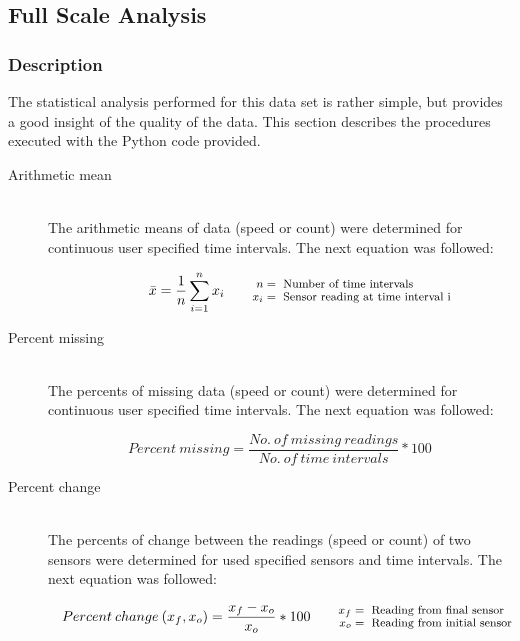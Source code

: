 \documentclass[11pt]{article}
\begin{document}
\subsection{Full Scale Analysis}

\subsubsection{Description}
The statistical analysis performed for this data set is rather simple, but provides a good insight of the quality of the data. This section describes the procedures executed with the Python code provided.

\begin{description}
	\item[Arithmetic mean] \hfill \\
	The arithmetic means of data (speed or count) were determined for continuous user specified time intervals. The next equation was followed:	
	

	\begin{equation}
		\bar{x} = \frac{1}{n}\sum\limits_{i=1}^{n}x_i
		\qquad\parbox{4.0cm}{\footnotesize$
		\begin{aligned}
			 n &= \text{ Number of time intervals}\\[-1.0ex]
			 x_{i} &= \text{ Sensor reading at time interval i}
		\end{aligned}$}
	\end{equation}	
	
	
	\item[Percent missing] \hfill \\
	The percents of missing data (speed or count) were determined for continuous user specified time intervals. The next equation was followed:

	\begin{equation}
		{Percent\:missing} = \frac{No.\:of\:missing\:readings}{No.\:of\:time\:intervals}*100	
	\end{equation}		
	
	\item[Percent change] \hfill \\
	The percents of change between the readings (speed or count) of two sensors were determined for used specified sensors and time intervals. The next equation was followed:
	
	\begin{equation}
		{Percent\:change\:(x_{f},x_{o})} = \frac{x_{f}-x_{o}}{x_{o}}*100
		\qquad\parbox{4.0cm}{\footnotesize$
		\begin{aligned}
			 x_{f} &= \text{ Reading from final sensor}\\[-1.0ex]
			 x_{o} &= \text{ Reading from initial sensor }
		\end{aligned}$}
	\end{equation}

\end{description}
\end{document}
